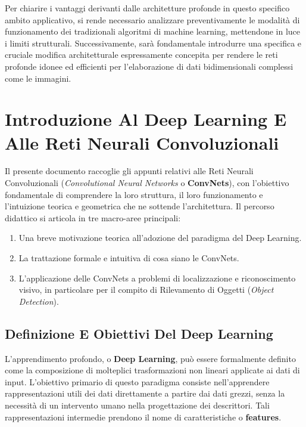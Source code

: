 ﻿\documentclass[11pt, a4paper]{article}
\begin{document}
Per chiarire i vantaggi derivanti dalle architetture profonde in questo specifico ambito applicativo, si rende necessario analizzare preventivamente le modalità di funzionamento dei tradizionali algoritmi di machine learning, mettendone in luce i limiti strutturali. Successivamente, sarà fondamentale introdurre una specifica e cruciale modifica architetturale espressamente concepita per rendere le reti profonde idonee ed efficienti per l'elaborazione di dati bidimensionali complessi come le immagini.

\section{Introduzione Al Deep Learning E Alle Reti Neurali Convoluzionali}


Il presente documento raccoglie gli appunti relativi alle Reti Neurali Convoluzionali (\emph{Convolutional Neural Networks} o \textbf{ConvNets}), con l'obiettivo fondamentale di comprendere la loro struttura, il loro funzionamento e l'intuizione teorica e geometrica che ne sottende l'architettura. Il percorso didattico si articola in tre macro-aree principali:
\begin{enumerate}[noitemsep]
    \item Una breve motivazione teorica all'adozione del paradigma del Deep Learning.
    \item La trattazione formale e intuitiva di cosa siano le ConvNets.
    \item L'applicazione delle ConvNets a problemi di localizzazione e riconoscimento visivo, in particolare per il compito di Rilevamento di Oggetti (\emph{Object Detection}).
\end{enumerate}

\subsection{Definizione E Obiettivi Del Deep Learning}

L'apprendimento profondo, o \textbf{Deep Learning}, può essere formalmente definito come la composizione di molteplici trasformazioni non lineari applicate ai dati di input. L'obiettivo primario di questo paradigma consiste nell'apprendere rappresentazioni utili dei dati direttamente a partire dai dati grezzi, senza la necessità di un intervento umano nella progettazione dei descrittori. Tali rappresentazioni intermedie prendono il nome di caratteristiche o \textbf{features}.
\end{document}
